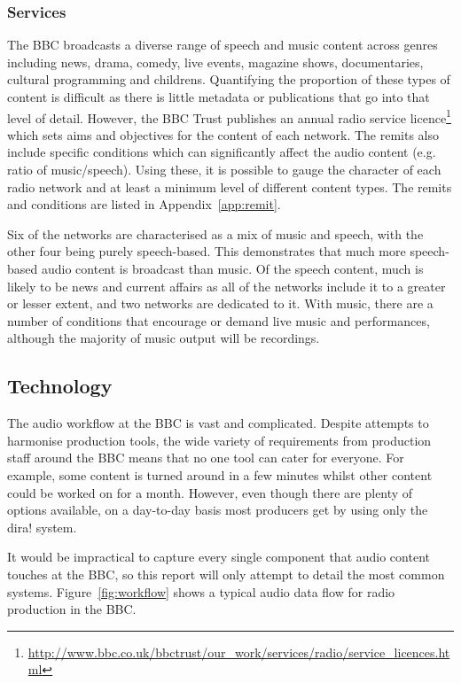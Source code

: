 \subsubsection{Services}
The BBC broadcasts a diverse range of speech and music content across genres
including news, drama, comedy, live events, magazine shows, documentaries,
cultural programming and childrens. Quantifying the proportion of these types
of content is difficult as there is little metadata or publications that go
into that level of detail. However, the BBC Trust publishes an annual radio
service
licence\footnote{\url{http://www.bbc.co.uk/bbctrust/our_work/services/radio/service_licences.html}}
which sets aims and objectives for the content of each network. The remits also
include specific conditions which can significantly affect the audio content
(e.g. ratio of music/speech). Using these, it is possible to gauge the
character of each radio network and at least a minimum level of different
content types. The remits and conditions are listed in
Appendix~\ref{app:remit}.

Six of the networks are characterised as a mix of music and speech, with the
other four being purely speech-based. This demonstrates that much more
speech-based audio content is broadcast than music. Of the speech content, much
is likely to be news and current affairs as all of the networks include it to a
greater or lesser extent, and two networks are dedicated to it. With music,
there are a number of conditions that encourage or demand live music and
performances, although the majority of music output will be recordings.

\subsection{Technology}\label{sec:workflow}
The audio workflow at the BBC is vast and complicated. Despite attempts to
harmonise production tools, the wide variety of requirements from production
staff around the BBC means that no one tool can cater for everyone. For
example, some content is turned around in a few minutes whilst other content
could be worked on for a month. However, even though there are plenty of
options available, on a day-to-day basis most producers get by using only the
dira! system.

It would be impractical to capture every single component that audio content
touches at the BBC, so this report will only attempt to detail the most common
systems.  Figure~\ref{fig:workflow} shows a typical audio data flow for radio
production in the BBC.

